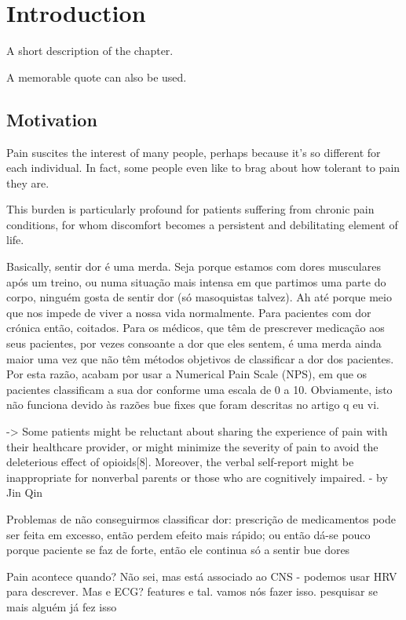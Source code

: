 \chapter{Introduction}%
\label{chapter:introduction}

\begin{introduction}
A short description of the chapter.

A memorable quote can also be used.
\end{introduction}


\section{Motivation}
Pain suscites the interest of many people, perhaps because it's so different for each individual. In fact, some people even like to brag about how tolerant to pain they are. 

This burden is particularly profound for patients suffering from chronic pain conditions, for whom discomfort becomes a persistent and debilitating element of life.

Basically, sentir dor é uma merda. Seja porque estamos com dores musculares após um treino, ou numa situação mais intensa em que partimos uma parte do corpo, ninguém gosta de sentir dor (só masoquistas talvez). Ah até porque meio que nos impede de viver a nossa vida normalmente. Para pacientes com dor crónica então, coitados. Para os médicos, que têm de prescrever medicação aos seus pacientes, por vezes consoante a dor que eles sentem, é uma merda ainda maior uma vez que não têm métodos objetivos de classificar a dor dos pacientes. Por esta razão, acabam por usar a Numerical Pain Scale (NPS), em que os pacientes classificam a sua dor conforme uma escala de 0 a 10. Obviamente, isto não funciona devido às razões bue fixes que foram descritas no artigo q eu vi.

-> Some patients might be reluctant about sharing the experience of pain with their healthcare provider, or might minimize the severity of pain to avoid the deleterious effect of opioids[8]. Moreover, the verbal self-report might be inappropriate for nonverbal parents or those who are cognitively impaired. - by Jin Qin

Problemas de não conseguirmos classificar dor: prescrição de medicamentos pode ser feita em excesso, então perdem efeito mais rápido; ou então dá-se pouco porque paciente se faz de forte, então ele continua só a sentir bue dores

Pain acontece quando? Não sei, mas está associado ao CNS - podemos usar HRV para descrever. Mas e ECG? features e tal. vamos nós fazer isso. pesquisar se mais alguém já fez isso